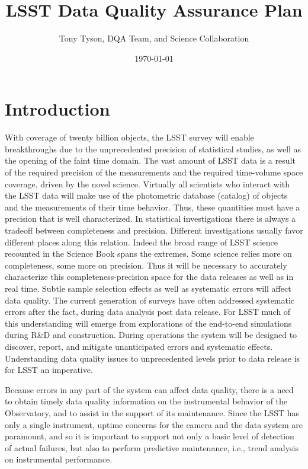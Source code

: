 \documentclass[SE,toc,lsstdraft]{lsstdoc}
\title{LSST Data Quality Assurance Plan}
\author{Tony Tyson, DQA Team, and Science Collaboration}
\date{\today}
\begin{document}
\maketitle

\section{Introduction}

With coverage of twenty billion objects, the LSST survey will enable breakthroughs due to the unprecedented precision of statistical studies, as well as the opening of the faint time domain. The vast amount of LSST data is a result of the required precision of the measurements and the required time-volume space coverage, driven by the novel science. Virtually all scientists who interact with the LSST data will make use of the photometric database (catalog) of objects and the measurements of their time behavior. Thus, these quantities must have a precision that is well characterized.  In statistical investigations there is always a tradeoff between completeness and precision. Different investigations usually favor different places along this relation.  Indeed the broad range of LSST science recounted in the Science Book \citep{2009arXiv0912.0201L} spans the extremes. Some science relies more on completeness, some more on precision. Thus it will be necessary to accurately characterize this completeness-precision space for the data releases as well as in real time. Subtle sample selection effects as well as systematic errors will affect data quality. The current generation of surveys have often addressed systematic errors after the fact, during data analysis post data release. For LSST much of this understanding will emerge from explorations of the end-to-end simulations during R\&D and construction.  During operations the system will be designed to discover, report, and mitigate unanticipated errors and systematic effects.  Understanding data quality issues to unprecedented levels prior to data release is for LSST an imperative.

Because errors in any part of the system can affect data quality, there is a need to obtain timely data quality information on the instrumental behavior of the Observatory, and to assist in the support of its maintenance. Since the LSST has only a single instrument, uptime concerns for the camera and the data system are paramount, and so it is important to support not only a basic level of detection of actual failures, but also to perform predictive maintenance, i.e., trend analysis on instrumental performance.
\end{document}
